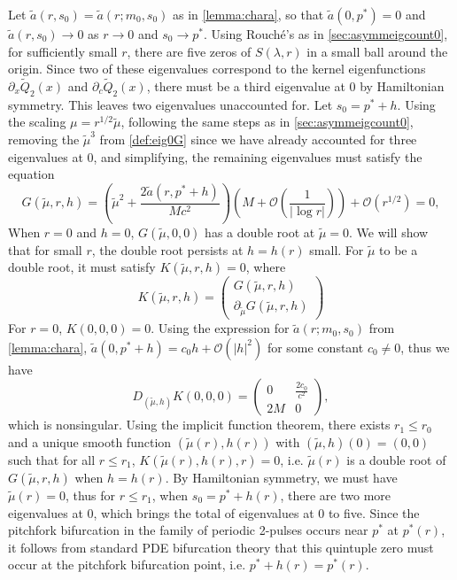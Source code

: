 \documentclass[10pt,reqno]{amsart}
\theoremstyle{plain}
\theoremstyle{definition}
\theoremstyle{remark}
\numberwithin{theorem}{section}
\numberwithin{equation}{section}
\begin{document}
Let $\tilde{a}(r, s_0) = \tilde{a}(r; m_0, s_0)$ as in \cref{lemma:chara}, so that $\tilde{a}(0, p^*) = 0$ and $\tilde{a}(r, s_0) \rightarrow 0$ as $r \rightarrow 0$ and $s_0 \rightarrow p^*$. Using Rouch\'{e}'s as in \cref{sec:asymmeigcount0}, for sufficiently small $r$, there are five zeros of $S(\lambda, r)$ in a small ball around the origin. Since two of these eigenvalues correspond to the kernel eigenfunctions $\partial_x \tilde{Q}_2(x)$ and $\partial_c \tilde{Q}_2(x)$, there must be a third eigenvalue at 0 by Hamiltonian symmetry. This leaves two eigenvalues unaccounted for. Let $s_0 = p^* + h$. Using the scaling $\mu = r^{1/2} \tilde{\mu}$, following the same steps as in \cref{sec:asymmeigcount0}, removing the $\tilde{\mu}^3$ from \cref{def:eig0G} since we have already accounted for three eigenvalues at 0, and simplifying, the remaining eigenvalues must satisfy the equation
\begin{equation}\label{def:symmG}
G(\tilde{\mu}, r, h) = \left( \tilde{\mu}^2 + \frac{2 \tilde{a}(r, p^* + h)}{M c^2} \right)
\left( M + \mathcal{O}\left(\frac{1}{|\log r|} \right) \right)
 + \mathcal{O}\left( r^{1/2} \right) = 0,
\end{equation}
When $r = 0$ and $h = 0$, $G(\tilde{\mu}, 0, 0)$ has a double root at $\tilde{\mu} = 0$. We will show that for small $r$, the double root persists at $h = h(r)$ small. For $\tilde{\mu}$ to be a double root, it must satisfy $K(\tilde{\mu}, r, h) = 0$, where
\begin{equation*}
K(\tilde{\mu}, r, h) = 
\begin{pmatrix}G(\tilde{\mu}, r, h) \\ \partial_{\tilde{\mu}}G(\tilde{\mu}, r, h) \end{pmatrix} 
\end{equation*}
For $r = 0$, $K(0, 0, 0) = 0$. Using the expression for $\tilde{a}(r; m_0, s_0)$ from \cref{lemma:chara}, $\tilde{a}(0, p^* + h) = c_0 h + \mathcal{O}(|h|^2)$ for some constant $c_0 \neq 0$, thus we have
\begin{equation*}
D_{(\tilde{\mu}, h)}K(0, 0, 0) = 
\begin{pmatrix}
0 & \frac{2 c_0}{c^2} \\
2M & 0
\end{pmatrix},
\end{equation*}
which is nonsingular. Using the implicit function theorem, there exists $r_1 \leq r_0$ and a unique smooth function $(\tilde{\mu}(r), h(r))$ with $(\tilde{\mu}, h)(0) = (0, 0)$ such that for all $r \leq r_1$, $K(\tilde{\mu}(r), h(r), r) = 0$, i.e. $\tilde{\mu}(r)$ is a double root of $G(\tilde{\mu}, r, h)$ when $h = h(r)$. By Hamiltonian symmetry, we must have $\tilde{\mu}(r) = 0$, thus for $r \leq r_1$, when $s_0 = p^* + h(r)$, there are two more eigenvalues at 0, which brings the total of eigenvalues at 0 to five. Since the pitchfork bifurcation in the family of periodic 2-pulses occurs near $p^*$ at $p^*(r)$, it follows from standard PDE bifurcation theory that this quintuple zero must occur at the pitchfork bifurcation point, i.e. $p^* + h(r) = p^*(r)$.
\end{document}
